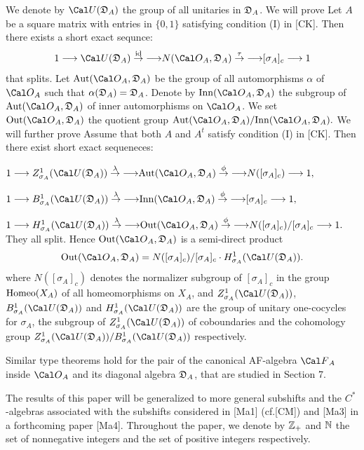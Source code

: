 We denote by ${\Cal U}(\DA)$ the group of all unitaries
in ${{\frak D}_A}$.
We will prove 
Let $A$ be a square matrix with entries in $\{0,1\}$
satisfying condition (I) in [CK].
Then there exists a short exact  sequnce:
$$
1 
\longrightarrow {\Cal U}(\DA)
\overset{\id}\to{\longrightarrow} N(\OA,\DA)
\overset{\tau}\to{\longrightarrow} [\sigma_A ]_c
\longrightarrow 1
$$
that splits.
\endproclaim
Let $\Aut(\OA,\DA)$
be the group of all automorphisms $\alpha$ of 
$\OA$ such that $\alpha({{\frak D}_A}) = {{\frak D}_A}$.  
Denote by $\Inn(\OA,\DA)$ the subgroup of $\Aut(\OA,\DA)$ 
of inner automorphisms
on $\OA$.
We set 
$
\Out(\OA,\DA) 
$
the quotient group
$\Aut(\OA,\DA)/\Inn(\OA,\DA).$
We will further prove 
Assume that both  $A$ and  $A^t$  satisfy condition (I) in [CK]. 
Then there exist short exact sequeneces:
\roster
\item
$
1 
\longrightarrow Z_{\sigma_A}^1({\Cal U}(\DA))
\overset{\lambda}\to{\longrightarrow} \Aut(\OA,\DA)
\overset{\phi}\to{\longrightarrow} N([\sigma_A ]_c)
\longrightarrow 1,
$
\item
$
1 
\longrightarrow B_{\sigma_A}^1({\Cal U}(\DA))
\overset{\lambda}\to{\longrightarrow} \Inn(\OA,\DA)
\overset{\phi}\to{\longrightarrow} [\sigma_A ]_c
\longrightarrow 1,
$
\item
$
1 
\longrightarrow H_{\sigma_A}^1({\Cal U}(\DA))
\overset{\lambda}\to{\longrightarrow} \Out(\OA,\DA)
\overset{\phi}\to{\longrightarrow} N([\sigma_A ]_c) / [\sigma_A ]_c
\longrightarrow 1.
$
\endroster
They all split. 
Hence  
$
\Out(\OA,\DA)
$
is a  semi-direct product
$$
\Out(\OA,\DA)
= N([\sigma_A ]_c) / [\sigma_A ]_c \cdot H_{\sigma_A}^1({\Cal U}(\DA)).
$$ 
\endproclaim
where $N([\sigma_A]_c)$ denotes the normalizer subgroup of
$[\sigma_A]_c$ in the group ${{\operatorname{Homeo}}}(X_A)$ of all homeomorphisms on $X_A$,
and
$Z_{\sigma_A}^1({\Cal U}(\DA))$,
$B_{\sigma_A}^1({\Cal U}(\DA))$
and
$H_{\sigma_A}^1({\Cal U}(\DA))$
are the group of unitary one-cocycles for $\sigma_A$,
the subgroup of $Z_{\sigma_A}^1({\Cal U}(\DA))$
of coboundaries and the cohomology group
$Z_{\sigma_A}^1({\Cal U}(\DA))/ B_{\sigma_A}^1({\Cal U}(\DA))$
respectively.

Similar type theorems hold for the pair of the canonical AF-algebra $\FA$  
inside $\OA$ and its diagonal algebra ${{\frak D}_A}$, that are studied in Section 7.

The results of this paper will be generalized to more general  
subshifts and the $C^*$-algebras associated with the subshifts considered in
[Ma1] (cf.[CM]) and [Ma3] in a forthcoming paper [Ma4]. 
Throughout the paper,
we denote by
${ {\Bbb Z}_+ }$ and $\Bbb N$ the set of nonnegative integers and the set of positive integers
respectively.
\medskip


